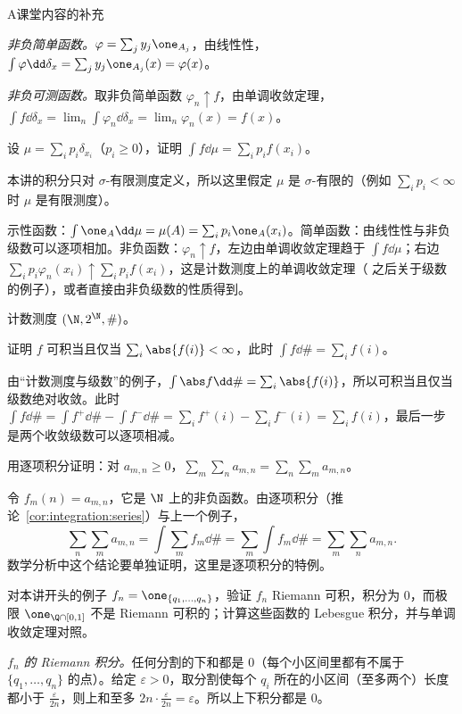 \begin{exercises}{A}{课堂内容的补充}
\begin{questions}
\begin{solution}
\emph{非负简单函数。}$\varphi=\sum_jy_j\one_{A_j}$，由线性性，$\int\varphi\dd\delta_x=\sum_jy_j\one_{A_j}(x)=\varphi(x)$。

\emph{非负可测函数。}取非负简单函数 $\varphi_n\uparrow f$，由单调收敛定理，$\int f\dd\delta_x=\lim_n\int\varphi_n\dd\delta_x=\lim_n\varphi_n(x)=f(x)$。
\end{solution}
\item 设 $\mu=\sum_ip_i\delta_{x_i}$（$p_i\geqslant0$），证明 $\int f\dd\mu=\sum_ip_if(x_i)$。
\begin{solution}
本讲的积分只对 $\sigma$-有限测度定义，所以这里假定 $\mu$ 是 $\sigma$-有限的（例如 $\sum_ip_i<\infty$ 时 $\mu$ 是有限测度）。

示性函数：$\int\one_A\dd\mu=\mu(A)=\sum_ip_i\one_A(x_i)$。简单函数：由线性性与非负级数可以逐项相加。非负函数：$\varphi_n\uparrow f$，左边由单调收敛定理趋于 $\int f\dd\mu$；右边 $\sum_ip_i\varphi_n(x_i)\uparrow\sum_ip_if(x_i)$，这是计数测度上的单调收敛定理（ 之后关于级数的例子），或者直接由非负级数的性质得到。
\end{solution}
\end{questions}

\item\label{ex:integration:A3} 计数测度 $(\N,2^\N,\#)$。
\begin{questions}
\item 证明 $f$ 可积当且仅当 $\sum_i\abs{f(i)}<\infty$，此时 $\int f\dd\#=\sum_if(i)$。
\begin{solution}
由“计数测度与级数”的例子，$\int\abs f\dd\#=\sum_i\abs{f(i)}$，所以可积当且仅当级数绝对收敛。此时 $\int f\dd\#=\int f^+\dd\#-\int f^-\dd\#=\sum_if^+(i)-\sum_if^-(i)=\sum_if(i)$，最后一步是两个收敛级数可以逐项相减。
\end{solution}
\item 用逐项积分证明：对 $a_{m,n}\geqslant0$，$\sum_m\sum_na_{m,n}=\sum_n\sum_ma_{m,n}$。
\begin{solution}
令 $f_m(n)=a_{m,n}$，它是 $\N$ 上的非负函数。由逐项积分（推论~\ref{cor:integration:series}）与上一个例子，
\[
\sum_n\sum_ma_{m,n}=\int\sum_mf_m\dd\#=\sum_m\int f_m\dd\#=\sum_m\sum_na_{m,n}.
\]
数学分析中这个结论要单独证明，这里是逐项积分的特例。
\end{solution}
\end{questions}

\item\label{ex:integration:A4} 对本讲开头的例子 $f_n=\one_{\{q_1,\dots,q_n\}}$，验证 $f_n$ Riemann 可积，积分为 $0$，而极限 $\one_{\Q\cap[0,1]}$ 不是 Riemann 可积的；计算这些函数的 Lebesgue 积分，并与单调收敛定理对照。
\begin{solution}
\emph{$f_n$ 的 Riemann 积分。}任何分割的下和都是 $0$（每个小区间里都有不属于 $\{q_1,\dots,q_n\}$ 的点）。给定 $\varepsilon>0$，取分割使每个 $q_i$ 所在的小区间（至多两个）长度都小于 $\frac\varepsilon{2n}$，则上和至多 $2n\cdot\frac\varepsilon{2n}=\varepsilon$。所以上下积分都是 $0$。


\end{solution}
\end{exercises}
